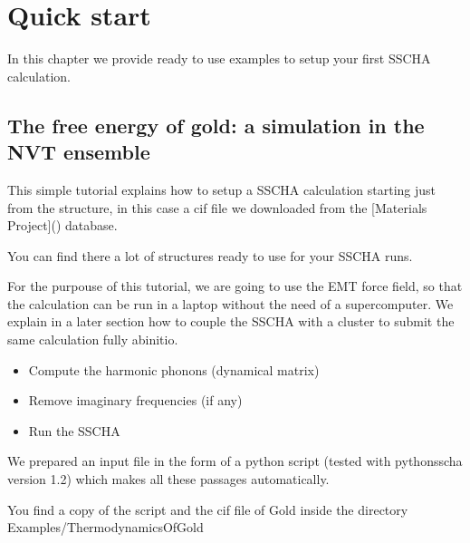 \documentclass[a4paper,11pt,english]{sphinxmanual}
\begin{document}
\chapter{Quick start}
\label{\detokenize{start:quick-start}}\label{\detokenize{start::doc}}
\sphinxAtStartPar
In this chapter we provide ready to use examples to setup your first SSCHA calculation.


\section{The free energy of gold: a simulation in the NVT ensemble}
\label{\detokenize{start:the-free-energy-of-gold-a-simulation-in-the-nvt-ensemble}}
\sphinxAtStartPar
This simple tutorial explains how to setup a SSCHA calculation starting just from the structure, in this case a cif file we downloaded from the {[}Materials Project{]}() database.

\sphinxAtStartPar
You can find there a lot of structures ready to use for your SSCHA runs.

\sphinxAtStartPar
For the purpouse of this tutorial, we are going to use the EMT force field, so that the calculation can be run in a laptop without the need of a supercomputer.
We explain in a later section how to couple the SSCHA with a cluster to submit the same calculation fully ab\sphinxhyphen{}initio.
\begin{description}
\begin{itemize}
\item {} 
\sphinxAtStartPar
Compute the harmonic phonons (dynamical matrix)

\item {} 
\sphinxAtStartPar
Remove imaginary frequencies (if any)

\item {} 
\sphinxAtStartPar
Run the SSCHA

\end{itemize}

\end{description}

\sphinxAtStartPar
We prepared an input file in the form of a python script (tested with python\sphinxhyphen{}sscha version 1.2) which makes all these passages automatically.

\sphinxAtStartPar
You find a copy of the script and the cif file of Gold inside the directory Examples/ThermodynamicsOfGold
\end{document}
